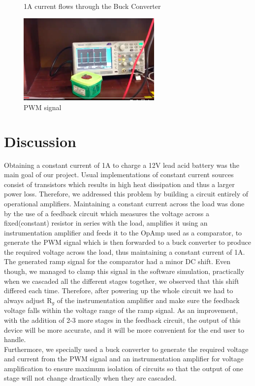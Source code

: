 \documentclass[a4paper,12pt]{article}
\begin{document}
\begin{multicols}{2}
\begin{figure}[H]
    \caption{1A current flows through the Buck Converter}
    \label{fig:1A current flows through the Buck circuit}
\end{figure}
\begin{figure}[H]
    \centering
    \includegraphics[width=7cm]{PWM_Signal.png}
    \caption{PWM signal}
    \label{fig:PWM_signal_result}
\end{figure}
\section{Discussion}
Obtaining a constant current of 1A to charge a 12V lead acid battery was the main goal of our project. Usual implementations of constant current sources consist of transistors which results in high heat dissipation and thus a larger power loss. Therefore, we addressed this problem by building a circuit entirely of operational amplifiers. Maintaining a constant current across the load was done by the use of a feedback circuit which measures the voltage across a fixed(constant) resistor in series with the load, amplifies it using an instrumentation amplifier and feeds it to the OpAmp used as a comparator, to generate the PWM signal which is then forwarded to a buck converter to produce the required voltage across the load, thus maintaining a constant current of 1A.\\
The generated ramp signal for the comparator had a minor DC shift. Even though, we managed to clamp this signal in the software simulation, practically when we cascaded all the different stages together, we observed that this shift differed each time. Therefore, after powering up the whole circuit we had to always adjust R$_g$ of the instrumentation amplifier and make sure the feedback voltage falls within the voltage range of the ramp signal. As an improvement, with the addition of 2-3 more stages in the feedback circuit, the output of this device will be more accurate, and it will be more convenient for the end user to handle.\\
Furthermore, we specially used a buck converter to generate the required voltage and current from the PWM signal and an instrumentation amplifier for voltage amplification to ensure maximum isolation of circuits so that the output of one stage will not change drastically when they are cascaded.

\end{multicols}
\end{document}
